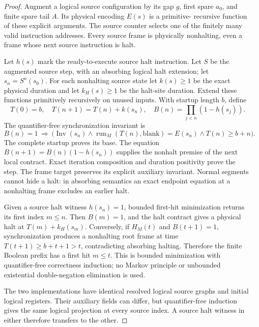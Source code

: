 \begin{proof}
Augment a logical source configuration by its gap $g$, first spare $a_0$,
and finite spare tail $A$. Its physical encoding $E(s)$ is a primitive-
recursive function of these explicit arguments. The source counter
selects one of the finitely many valid instruction addresses. Every
source frame is physically nonhalting, even a frame whose next source
instruction is halt.

Let $h(s)$ mark the ready-to-execute source halt instruction. Let $S$ be
the augmented source step, with an absorbing logical halt extension;
let $s_n=S^n(s_0)$. For each nonhalting source state let $k(s)\ge1$ be the
exact physical duration and let $k_H(s)\ge1$ be the halt-site duration.
Extend these functions primitively recursively on unused inputs. With
startup length $b$, define
\[
 T(0)=b,\quad T(n+1)=T(n)+k(s_n),\quad
 B(n)=\prod_{j<n}(1-h(s_j)).
\]
The quantifier-free synchronization invariant is
\[
 B(n)=1\ \Longrightarrow\
 \bigl(\operatorname{Inv}(s_n)\land
 \operatorname{run}_M(T(n),\mathrm{blank})=E(s_n)
 \land T(n)\ge b+n\bigr).
\]
The complete startup proves its base. The equation
$B(n+1)=B(n)(1-h(s_n))$ supplies the nonhalt premise of the next local
contract. Exact iteration composition and duration positivity prove the
step. The frame target preserves its explicit auxiliary invariant.
Normal segments cannot hide a halt: in absorbing semantics an exact
endpoint equation at a nonhalting frame excludes an earlier halt.

Given a source halt witness $h(s_n)=1$, bounded first-hit minimization
returns its first index $m\le n$. Then $B(m)=1$, and the halt contract
gives a physical halt at $T(m)+k_H(s_m)$. Conversely, if $H_M(t)$ and
$B(t+1)=1$, synchronization produces a nonhalting root frame at time
$T(t+1)\ge b+t+1>t$, contradicting absorbing halting. Therefore the finite
Boolean prefix has a first hit $m\le t$. This is bounded minimization
with quantifier-free correctness induction; no Markov principle or
unbounded existential double-negation elimination is used.

The two implementations have identical resolved logical source graphs
and initial logical registers. Their auxiliary fields can differ, but
quantifier-free induction gives the same logical projection at every
source index. A source halt witness in either therefore transfers to
the other.


\end{proof}

